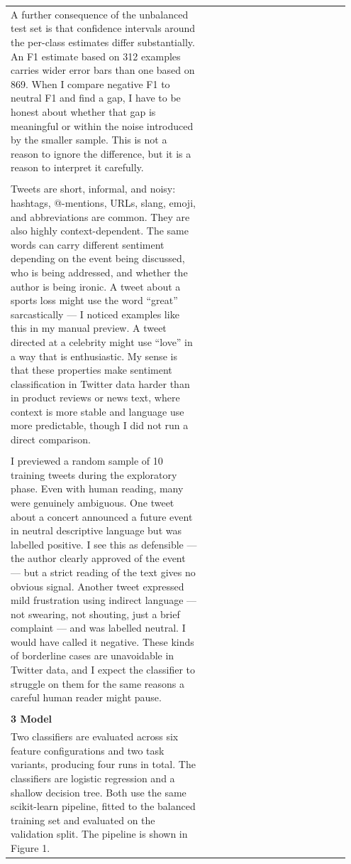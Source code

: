 \documentclass[11pt]{article}
\begin{document}
\begin{longtable}{|p{0.55\linewidth}|p{0.40\linewidth}|}
\hline
\rule{0pt}{3.5cm} & \\
\hline
A further consequence of the unbalanced test set is that confidence intervals around the per-class estimates differ substantially. An F1 estimate based on 312 examples carries wider error bars than one based on 869. When I compare negative F1 to neutral F1 and find a gap, I have to be honest about whether that gap is meaningful or within the noise introduced by the smaller sample. This is not a reason to ignore the difference, but it is a reason to interpret it carefully. & \\[2pt]
\hline
\rule{0pt}{3.5cm} & \\
\hline
Tweets are short, informal, and noisy: hashtags, @-mentions, URLs, slang, emoji, and abbreviations are common. They are also highly context-dependent. The same words can carry different sentiment depending on the event being discussed, who is being addressed, and whether the author is being ironic. A tweet about a sports loss might use the word ``great'' sarcastically --- I noticed examples like this in my manual preview. A tweet directed at a celebrity might use ``love'' in a way that is enthusiastic. My sense is that these properties make sentiment classification in Twitter data harder than in product reviews or news text, where context is more stable and language use more predictable, though I did not run a direct comparison. & \\[2pt]
\hline
\rule{0pt}{3.5cm} & \\
\hline
I previewed a random sample of 10 training tweets during the exploratory phase. Even with human reading, many were genuinely ambiguous. One tweet about a concert announced a future event in neutral descriptive language but was labelled positive. I see this as defensible --- the author clearly approved of the event --- but a strict reading of the text gives no obvious signal. Another tweet expressed mild frustration using indirect language --- not swearing, not shouting, just a brief complaint --- and was labelled neutral. I would have called it negative. These kinds of borderline cases are unavoidable in Twitter data, and I expect the classifier to struggle on them for the same reasons a careful human reader might pause. & \\[2pt]
\hline
\rule{0pt}{3.5cm} & \\
\hline
\multicolumn{2}{|l|}{\textbf{3 Model}} \\[2pt]
\hline
Two classifiers are evaluated across six feature configurations and two task variants, producing four runs in total. The classifiers are logistic regression and a shallow decision tree. Both use the same scikit-learn pipeline, fitted to the balanced training set and evaluated on the validation split. The pipeline is shown in Figure 1. & \\[2pt]

\end{longtable}
\end{document}
